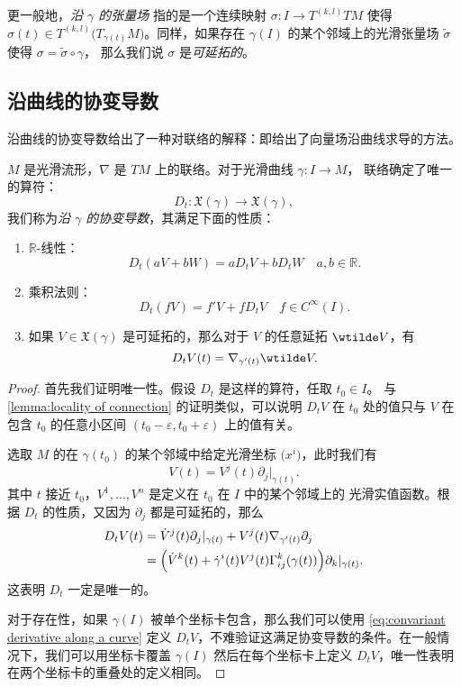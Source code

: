 \documentclass[fontset=none]{Notes}
\begin{document}
更一般地，\emph{沿 $\gamma$ 的张量场} 指的是一个连续映射 $\sigma:I\to T^{(k,l)}TM$
使得 $\sigma(t)\in T^{(k,l)}\bigl(T_{\gamma(t)}M\bigr)$。同样，如果存在
$\gamma(I)$ 的某个邻域上的光滑张量场 $\tilde\sigma$ 使得 $\sigma=\tilde\sigma\circ\gamma$，
那么我们说 $\sigma$ 是\emph{可延拓的}。

\subsection{沿曲线的协变导数}

沿曲线的协变导数给出了一种对联络的解释：即给出了向量场沿曲线求导的方法。

\begin{theorem}[沿曲线的协变导数]\label{thm:convariant derivative along a curve}
  $M$ 是光滑流形，$\nabla$ 是 $TM$ 上的联络。对于光滑曲线 $\gamma:I\to M$，
  联络确定了唯一的算符：
  \[
    D_t:\mathfrak{X}(\gamma)\to \mathfrak{X}(\gamma),  
  \]
  我们称为\emph{沿 $\gamma$ 的协变导数}，其满足下面的性质：
  \begin{enumerate}
    \item $\mathbb{R}$-线性：
    \[
      D_t(aV+bW)=aD_tV+bD_tW\quad a,b\in \mathbb{R}.  
    \]
    \item 乘积法则：
    \[
      D_t(fV)=f'V+fD_tV\quad f\in C^\infty(I).  
    \]
    \item 如果 $V\in \mathfrak{X}(\gamma)$ 是可延拓的，那么对于 $V$ 的任意延拓 $\wtilde V$，有
    \[
      D_tV(t)=\nabla_{\gamma'(t)}\wtilde V.  
    \]
  \end{enumerate}
\end{theorem}
\begin{proof}
  首先我们证明唯一性。假设 $D_t$ 是这样的算符，任取 $t_0\in I$。
  与 \autoref{lemma:locality of connection} 的证明类似，可以说明 $D_tV$
  在 $t_0$ 处的值只与 $V$ 在包含 $t_0$ 的任意小区间 $(t_0-\varepsilon,t_0+\varepsilon)$
  上的值有关。

  选取 $M$ 的在 $\gamma(t_0)$ 的某个邻域中给定光滑坐标 $\bigl(x^i\bigr)$，此时我们有
  \[
    V(t)=V^j(t)\partial_j|_{\gamma(t)}.  
  \]
  其中 $t$ 接近 $t_0$，$V^1,\dots,V^n$ 是定义在 $t_0$ 在 $I$ 中的某个邻域上的 
  光滑实值函数。根据 $D_t$ 的性质，又因为 $\partial_j$ 都是可延拓的，那么
  \begin{equation}\label{eq:convariant derivative along a curve}
    \begin{aligned}
      D_tV(t)&=\dot V^j(t)\partial_j|_{\gamma(t)}+V^j(t)\nabla_{\gamma'(t)}\partial_j\\
      &=\Bigl(\dot V^k(t)+\dot\gamma^i(t)V^j(t)\Gamma_{ij}^k(\gamma(t))\Bigr)
      \partial_k|_{\gamma(t)}.
    \end{aligned}
  \end{equation}
  这表明 $D_t$ 一定是唯一的。

  对于存在性，如果 $\gamma(I)$ 被单个坐标卡包含，那么我们可以使用 \eqref{eq:convariant derivative along a curve} 
  定义 $D_tV$，不难验证这满足协变导数的条件。在一般情况下，我们可以用坐标卡覆盖 $\gamma(I)$
  然后在每个坐标卡上定义 $D_tV$，唯一性表明在两个坐标卡的重叠处的定义相同。
\end{proof}
\end{document}
